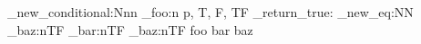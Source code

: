 \prg_new_conditional:Nnn
  \module_foo:n
  { p, T, F, TF }
  { \prg_return_true: }
\cs_new_eq:NN  %
  \module_baz:nTF
  \module_bar:nTF
\module_baz:nTF
  { foo }
  { bar }
  { baz }
